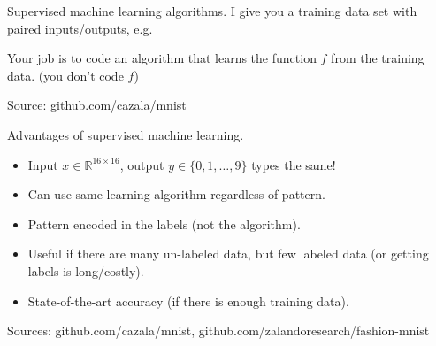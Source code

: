 \documentclass[12pt]{article}
\newcommand{\RR}{\mathbb R}
\begin{document}
  Supervised machine learning algorithms.
  I give you a training data set with paired inputs/outputs, e.g.



  Your job is to code an algorithm that learns the function $f$ from
  the training data. (you don't code $f$)
  
  Source: github.com/cazala/mnist

  Advantages of supervised machine learning.
  \begin{itemize}
  \item Input $x\in\RR^{16\times 16}$, output $y\in\{0,1,\dots,9\}$ types the same!
  \item Can use same learning algorithm regardless of pattern.
  \item Pattern encoded in the labels (not the algorithm).
  \item Useful if there are many un-labeled data, but few labeled data
    (or getting labels is long/costly).
  \item State-of-the-art accuracy (if there is enough training data).
  \end{itemize}
  Sources: github.com/cazala/mnist, github.com/zalandoresearch/fashion-mnist
\end{document}
